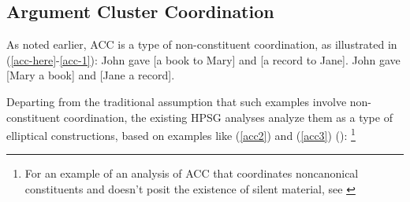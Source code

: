 \documentclass[output=paper
	        ,collection
	        ,collectionchapter
 	        ,biblatex
                ,babelshorthands
                ,newtxmath
                ,draftmode
                ,colorlinks, citecolor=brown
]{langscibook}
\begin{document}
{\iffalse{
To illustrate, an English verb form mismatch is depicted in (\ref{verbform}), from \citep[see][5]{Shiraishi2019}, where the left conjunct requires a participle while the shared material contains an infinitive form of the verb \textit{appear}.

\ea Some new hybrid models already have, and others soon will appear in the automobile industry.\label{verbform}

\citep{Shiraishi2019} capture verb form mismatch of this kind by introducing into their analysis of RNR the feature LID, which carries lexeme identity information. That is, this feature ensures semantic and syntactic category identity but ignores differences introduced by inflectional suffixes, with the result that the participle and the infinitive in (\ref{verbform}) count as lexeme-identical. RNR is licensed by including the LID feature in the MP feature also used in \citet{Chaves2014} (see (\ref{bpd})).
}\fi


\subsection{Argument Cluster Coordination}

As noted earlier, ACC is a type of non-constituent coordination, as
illustrated in (\ref{acc-here}-\ref{acc-1}):
%
%
\ea John gave [a book to Mary] and [a record to Jane].   \label{acc-here} \z
\ea John gave [Mary a book] and [Jane a record].  \label{acc-1} \z
%
%

Departing from the traditional assumption that such examples involve non-constituent
coordination, the existing HPSG analyses analyze them as a type of elliptical constructions,
based on examples like (\ref{acc2}) and (\ref{acc3}) (\citealt{Yatabe2001, Crysmann2003, Beavers2004}):
\footnote{For an example of an analysis of ACC that coordinates noncanonical constituents and doesn't posit the existence of silent material, see \citep{Mouret2006}}

}
\end{document}
